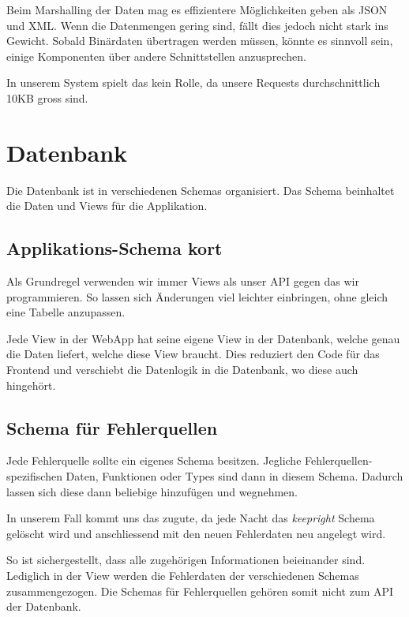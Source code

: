 Beim Marshalling der Daten mag es effizientere Möglichkeiten geben als JSON und XML.
Wenn die Datenmengen gering sind, fällt dies jedoch nicht stark ins Gewicht.
Sobald Binärdaten übertragen werden müssen, könnte es sinnvoll sein, einige Komponenten über andere Schnittstellen anzusprechen.

In unserem System spielt das kein Rolle, da unsere Requests durchschnittlich 10KB gross sind.


\section{Datenbank}
Die Datenbank ist in verschiedenen Schemas organisiert.
Das Schema  beinhaltet die Daten und Views für die Applikation.

\subsection{Applikations-Schema kort}
Als Grundregel verwenden wir immer Views als unser API gegen das wir programmieren.
So lassen sich Änderungen viel leichter einbringen, ohne gleich eine Tabelle anzupassen.

Jede View in der \gls{WebApp} hat seine eigene View in der Datenbank, welche genau die Daten liefert, welche diese View braucht.
Dies reduziert den Code für das Frontend und verschiebt die Datenlogik in die Datenbank, wo diese auch hingehört.

\subsection{Schema für Fehlerquellen}
Jede Fehlerquelle sollte ein eigenes Schema besitzen.
Jegliche Fehlerquellen-spezifischen Daten, Funktionen oder Types sind dann in diesem Schema.
Dadurch lassen sich diese dann beliebige hinzufügen und wegnehmen.

In unserem Fall kommt uns das zugute, da jede Nacht das \emph{keepright} Schema gelöscht wird und anschliessend mit den neuen Fehlerdaten neu angelegt wird.

So ist sichergestellt, dass alle zugehörigen Informationen beieinander sind.
Lediglich in der View  werden die Fehlerdaten der verschiedenen Schemas zusammengezogen.
Die Schemas für Fehlerquellen gehören somit nicht zum API der Datenbank.